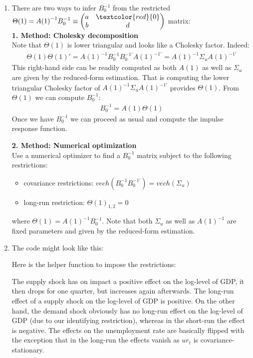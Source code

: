 \begin{enumerate}
\item There are two ways to infer \(B_{0}^{-1}\) from the restricted
\(\Theta(1) = {A(1)}^{-1} B_{0}^{-1} \equiv \begin{pmatrix} a & \textcolor{red}{0}\\ b & d \end{pmatrix}\) matrix:
\\
\textbf{1. Method: Cholesky decomposition}
\\
Note that \(\Theta(1)\) is lower triangular and looks like a Cholesky factor. Indeed:
\begin{align*}
\Theta(1) \Theta(1)' = {A(1)}^{-1} B_{0}^{-1} B_{0}^{-1'} {A(1)}^{-1'} = {A(1)}^{-1} \Sigma_{u} {A(1)}^{-1'}
\end{align*}
This right-hand side can be readily computed as both \(A(1)\) as well as \(\Sigma_{u}\) are given by the reduced-form estimation.
That is computing the lower triangular Cholesky factor of \({A(1)}^{-1} \Sigma_{u} {A(1)}^{-1'}\) provides \(\Theta(1)\).
From \(\Theta(1)\) we can compute \(B_{0}^{-1}\):
\begin{align*}
B_{0}^{-1} = A(1)\Theta(1)
\end{align*}
Once we have \(B_{0}^{-1}\) we can proceed as usual and compute the impulse response function.

\textbf{2. Method: Numerical optimization}
\\
Use a numerical optimizer to find a \(B_{0}^{-1}\) matrix subject to the following restrictions:
\begin{itemize}
\item covariance restrictions: \(vech(B_{0}^{-1} B_{0}^{-1'}) = vech(\Sigma_{u})\)
\item long-run restriction: \(\Theta{(1)}_{1,2} = 0\)
\end{itemize}
where \(\Theta(1) = {A(1)}^{-1} B_{0}^{-1}\).
Note that both \(\Sigma_{u}\) as well as \({A(1)}^{-1}\) are fixed parameters and given by the reduced-form estimation.

\item The code might look like this:

Here is the helper function to impose the restrictions:

The supply shock has on impact a positive effect on the log-level of GDP,
  it then drops for one quarter, but increases again afterwards.
The long-run effect of a supply shock on the log-level of GDP is positive.
On the other hand, the demand shock obviously has no long-run effect on the log-level of GDP (due to our identifying restriction),
  whereas in the short-run the effect is negative.
The effects on the unemployment rate are basically flipped
  with the exception that in the long-run the effects vanish as \({ur}_{t}\) is covariance-stationary.
\end{enumerate}